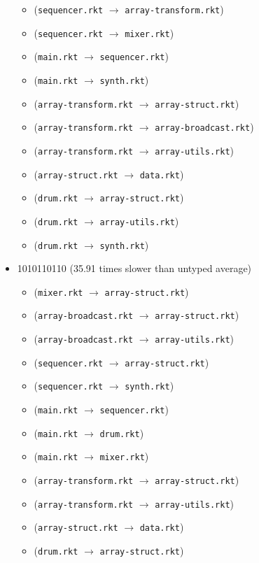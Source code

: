 \documentclass{article}
\newcommand{\mono}[1]{\texttt{#1}}
\begin{document}
\begin{itemize}
\begin{itemize}
  \item (\mono{sequencer.rkt} $\rightarrow$ \mono{array-transform.rkt})
  \item (\mono{sequencer.rkt} $\rightarrow$ \mono{mixer.rkt})
  \item (\mono{main.rkt} $\rightarrow$ \mono{sequencer.rkt})
  \item (\mono{main.rkt} $\rightarrow$ \mono{synth.rkt})
  \item (\mono{array-transform.rkt} $\rightarrow$ \mono{array-struct.rkt})
  \item (\mono{array-transform.rkt} $\rightarrow$ \mono{array-broadcast.rkt})
  \item (\mono{array-transform.rkt} $\rightarrow$ \mono{array-utils.rkt})
  \item (\mono{array-struct.rkt} $\rightarrow$ \mono{data.rkt})
  \item (\mono{drum.rkt} $\rightarrow$ \mono{array-struct.rkt})
  \item (\mono{drum.rkt} $\rightarrow$ \mono{array-utils.rkt})
  \item (\mono{drum.rkt} $\rightarrow$ \mono{synth.rkt})
  \end{itemize}
\item 1010110110 (35.91 times slower than untyped average)
  \begin{itemize}
  \item (\mono{mixer.rkt} $\rightarrow$ \mono{array-struct.rkt})
  \item (\mono{array-broadcast.rkt} $\rightarrow$ \mono{array-struct.rkt})
  \item (\mono{array-broadcast.rkt} $\rightarrow$ \mono{array-utils.rkt})
  \item (\mono{sequencer.rkt} $\rightarrow$ \mono{array-struct.rkt})
  \item (\mono{sequencer.rkt} $\rightarrow$ \mono{synth.rkt})
  \item (\mono{main.rkt} $\rightarrow$ \mono{sequencer.rkt})
  \item (\mono{main.rkt} $\rightarrow$ \mono{drum.rkt})
  \item (\mono{main.rkt} $\rightarrow$ \mono{mixer.rkt})
  \item (\mono{array-transform.rkt} $\rightarrow$ \mono{array-struct.rkt})
  \item (\mono{array-transform.rkt} $\rightarrow$ \mono{array-utils.rkt})
  \item (\mono{array-struct.rkt} $\rightarrow$ \mono{data.rkt})
  \item (\mono{drum.rkt} $\rightarrow$ \mono{array-struct.rkt})

\end{itemize}
\end{itemize}
\end{document}

